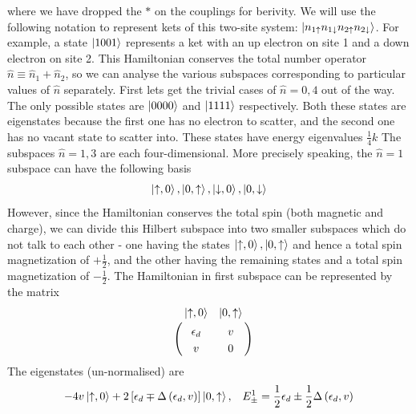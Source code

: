 \documentclass[12pt,twoside]{article}
\numberwithin{equation}{section}
\begin{document}
where we have dropped the \(*\) on the couplings for berivity. We will use the following notation to represent kets of this two-site system: \(\ket{n_{1 \uparrow}n_{1 \downarrow}n_{2 \uparrow}n_{2 \downarrow}}\). For example, a state \(\ket{1001}\) represents a ket with an up electron on site 1 and a down electron on site 2. This Hamiltonian conserves the total number operator \(\hat n \equiv \hat n_1 + \hat n_2\), so we can analyse the various subspaces corresponding to particular values of \(\hat n\) separately.
\pb First lets get the trivial cases of \(\hat n = 0, 4\) out of the way. The only possible states are \(\ket{0000}\) and \(\ket{1111}\) respectively. Both these states are eigenstates because the first one has no electron to scatter, and the second one has no vacant state to scatter into. These states have energy eigenvalues \( \frac{1}{4}k\)
\pb The subspaces \(\hat n = 1,3\) are each four-dimensional. More precisely speaking, the \(\hat n=1\) subspace can have the following basis
\begin{equation}\begin{aligned}
	\ket{\uparrow,0}, \ket{0,\uparrow}, \ket{\downarrow,0}, \ket{0,\downarrow}
\end{aligned}\end{equation}
However, since the Hamiltonian conserves the total spin (both magnetic and charge), we can divide this Hilbert subspace into two smaller subspaces which do not talk to each other - one having the states \(\ket{\uparrow,0}, \ket{0,\uparrow}\) and hence a total spin magnetization of \(+\frac{1}{2}\), and the other having the remaining states and a total spin magnetization of \(-\frac{1}{2}\).
The Hamiltonian in first subspace can be represented by the matrix
\begin{equation}\begin{aligned}
	\label{n1mat}
	\bordermatrix{~&\ket{\uparrow,0} & \ket{0,\uparrow} \\
		~&\epsilon_d & v \\
		~& v & 0 \\
	}
\end{aligned}\end{equation}
The eigenstates (un-normalised) are
\begin{equation}\begin{aligned}
\label{low}
	-4v\ket{\uparrow,0} +2 \left[ \epsilon_d \mp \Delta\left(\epsilon_d , v\right)\right] \ket{0, \uparrow}, && E^1_\pm = \frac{1}{2} \epsilon_d \pm \frac{1}{2}\Delta\left(\epsilon_d , v\right)
\end{aligned}\end{equation}
\end{document}
